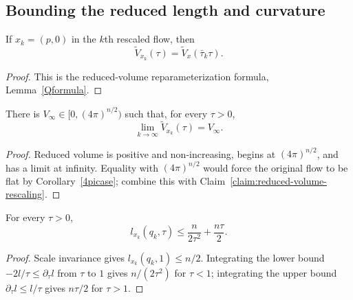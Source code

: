 \subsection{Bounding the reduced length and curvature}

\begin{claim}\label{claim:reduced-volume-rescaling}
\label{scaleinv2}
If $x_k=(p,0)$ in the $k$th rescaled flow, then
\[
 \widetilde V_{x_k}(\tau)=\widetilde V_x(\bar\tau_k\tau).
\]
\end{claim}
\begin{proof}
\sketch This is the reduced-volume reparameterization formula,
Lemma~\ref{Qformula}.
\end{proof}

\begin{corollary}\label{cor:reduced-volume-limit-constant}
\label{redvolconst}
There is $V_\infty\in[0,(4\pi)^{n/2})$ such that, for every
$\tau>0$,
\begin{equation}\label{limVeqn}
 \lim_{k\to\infty}\widetilde V_{x_k}(\tau)=V_\infty.
\end{equation}
\end{corollary}
\begin{proof}
\sketch Reduced volume is positive and non-increasing, begins at
$(4\pi)^{n/2}$, and has a limit at infinity. Equality with
$(4\pi)^{n/2}$ would force the original flow to be flat by
Corollary~\ref{4picase}; combine this with
Claim~\ref{claim:reduced-volume-rescaling}.
\end{proof}

\begin{claim}\label{claim:qk-length-bound}
\label{tausqtau}
For every $\tau>0$,
\[
 l_{x_k}(q_k,\tau)\leq\frac{n}{2\tau^2}+\frac{n\tau}{2}.
\]
\end{claim}
\begin{proof}
\sketch
{}
Scale invariance gives $l_{x_k}(q_k,1)\leq n/2$. Integrating the
lower bound $-2l/\tau\leq\partial_\tau l$ from $\tau$ to $1$ gives
$n/(2\tau^2)$ for $\tau<1$; integrating the upper bound
$\partial_\tau l\leq l/\tau$ gives $n\tau/2$ for $\tau>1$.
\end{proof}

